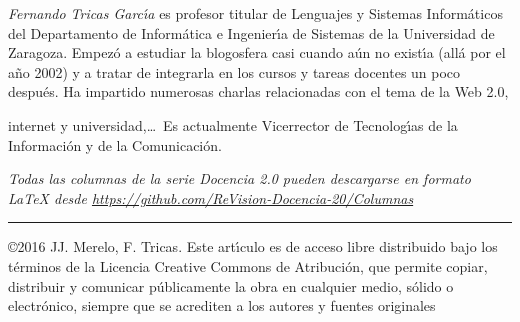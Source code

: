 \documentclass[twoside,10pt]{article}
\newcommand{\surl}[1]{{\small\url{#1}}}
\newcounter{num}
\begin{document}
\begin{multicols}{2}
\medskip

{\small{\begin{window}
		\noindent \emph{Fernando Tricas Garc\'{\i}a} es profesor
		titular de Lenguajes y Sistemas Inform\'{a}ticos del Departamento
		de Inform\'{a}tica e Ingenier\'{\i}a de Sistemas de la Universidad de
		Zaragoza.  Empez\'{o} a estudiar la blogosfera casi cuando a\'{u}n no
		exist\'{\i}a (all\'{a} por el a\~{n}o 2002) y a tratar de integrarla en los
		cursos y tareas docentes un poco despu\'{e}s.  Ha impartido
		numerosas charlas relacionadas con el tema de la Web 2.0, 

		internet y universidad,\ldots\ 
		Es actualmente Vicerrector de Tecnolog\'{\i}as de la Informaci\'{o}n y
de la Comunicaci\'{o}n.   
		\end{window}}}


\noindent  
\bigskip

\noindent\emph{Todas las columnas de la serie Docencia 2.0
pueden descargarse en formato LaTeX desde
\surl{https://github.com/ReVision-Docencia-20/Columnas}}

\noindent\rule{90mm}{1pt}

{\small \noindent\copyright 2016 JJ. Merelo, F. Tricas. Este art\'{\i}culo es de acceso libre distribuido bajo los t\'{e}rminos
de la Licencia Creative Commons de Atribuci\'{o}n, que permite copiar,
distribuir y comunicar p\'{u}blicamente la obra en cualquier medio, s\'{o}lido
o electr\'{o}nico, siempre que se acrediten a los autores y fuentes
originales}

\end{multicols}
\end{document}
